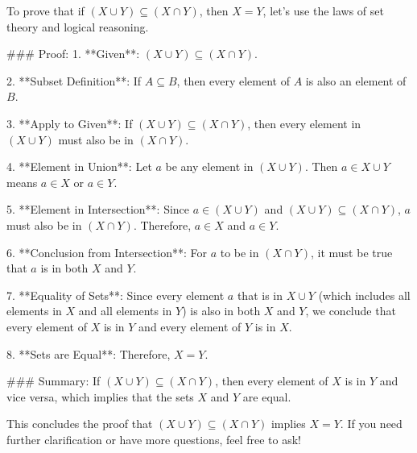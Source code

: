 To prove that if \((X \cup Y) \subseteq (X \cap Y)\), then \(X = Y\), let's use the laws of set theory and logical reasoning.

### Proof:
1. **Given**: \((X \cup Y) \subseteq (X \cap Y)\).

2. **Subset Definition**: If \(A \subseteq B\), then every element of \(A\) is also an element of \(B\).

3. **Apply to Given**: If \((X \cup Y) \subseteq (X \cap Y)\), then every element in \((X \cup Y)\) must also be in \((X \cap Y)\).

4. **Element in Union**: Let \(a\) be any element in \((X \cup Y)\). Then \(a \in X \cup Y\) means \(a \in X\) or \(a \in Y\).

5. **Element in Intersection**: Since \(a \in (X \cup Y)\) and \((X \cup Y) \subseteq (X \cap Y)\), \(a\) must also be in \((X \cap Y)\). Therefore, \(a \in X\) and \(a \in Y\).

6. **Conclusion from Intersection**: For \(a\) to be in \((X \cap Y)\), it must be true that \(a\) is in both \(X\) and \(Y\).

7. **Equality of Sets**: Since every element \(a\) that is in \(X \cup Y\) (which includes all elements in \(X\) and all elements in \(Y\)) is also in both \(X\) and \(Y\), we conclude that every element of \(X\) is in \(Y\) and every element of \(Y\) is in \(X\).

8. **Sets are Equal**: Therefore, \(X = Y\).

### Summary:
If \((X \cup Y) \subseteq (X \cap Y)\), then every element of \(X\) is in \(Y\) and vice versa, which implies that the sets \(X\) and \(Y\) are equal.

This concludes the proof that \((X \cup Y) \subseteq (X \cap Y)\) implies \(X = Y\). If you need further clarification or have more questions, feel free to ask!